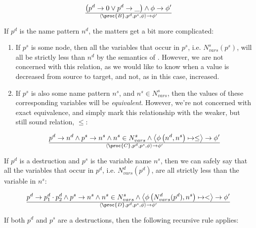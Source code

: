 \begin{equation}
{
\left(
    p^d\rightarrow 0
\vee
    p^d\rightarrow \_
\right)
  \wedge
    \phi\rightarrow\phi'
}\over{
  \left\langle\proc{B},p^d,p^s,\phi\right\rangle
  \rightarrow
  \phi'
}
\end{equation}

If $p^d$ is the name pattern $n^d$, the matters get a bit more complicated:

\begin{enumerate}

\item If $p^s$ is some node, then all the variables that occur in $p^s$, i.e.
$N_{vars}^s(p^s)$, will all be strictly less than $n^d$ by the semantics of
\D{}. However, we are not concerned with this relation, as we would like to
know when a value is decreased from source to target, and not, as in this case,
increased.

\item If $p^s$ is also some name pattern $n^s$, and  $n^s\in N^s_{vars}$, then
the values of these corresponding variables will be \emph{equivalent}. However,
we're not concerned with exact equivalence, and simply mark this relationship
with the weaker, but still sound relation, $\leq$:

\begin{equation}
{
    p^d\rightarrow n^d
  \wedge
    p^s\rightarrow n^s
  \wedge
    n^s\in N_{vars}^s
  \wedge
    \left\langle\phi\left(n^d, n^s\right)\mapsto \leq\right\rangle\rightarrow\phi'
}\over{
  \left\langle\proc{C},p^d,p^s,\phi\right\rangle
  \rightarrow
  \phi'
}
\end{equation}

\end{enumerate}

If $p^d$ is a destruction and $p^s$ is the variable name $n^s$, then we can safely say that
all the variables that occur in $p^d$, i.e. $N_{vars}^d(p^d)$, are all strictly less
than the variable in $n^s$:

\begin{equation}
{
    p^d\rightarrow p^d_1\cdot p^d_2
  \wedge
    p^s\rightarrow n^s
  \wedge
    n^s\in N_{vars}^s
  \wedge
    \left\langle\phi\left(N_{vars}^d(p^d), n^s\right)\mapsto <\right\rangle\rightarrow\phi'
}\over{
  \left\langle\proc{D},p^d,p^s,\phi\right\rangle
  \rightarrow
  \phi'
}
\end{equation}

If both $p^d$ and $p^s$ are a destructions, then the following recursive rule applies:

